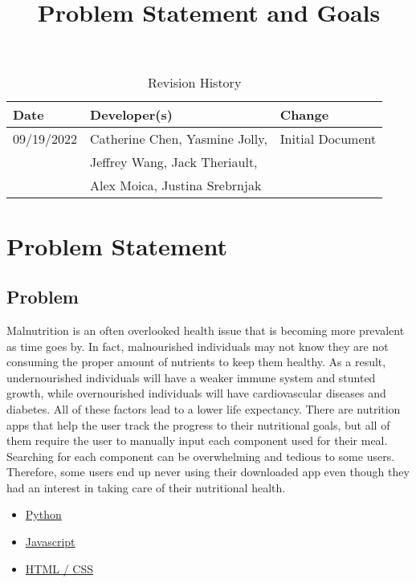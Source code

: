 \documentclass{article}
\title{Problem Statement and Goals\\\progname}
\author{\authname}
\date{}
\begin{document}
\maketitle

\begin{table}[hp]
\caption{Revision History} \label{TblRevisionHistory}
\begin{tabularx}{\textwidth}{llX}
\toprule
\textbf{Date} & \textbf{Developer(s)} & \textbf{Change}\\
\midrule
09/19/2022 & Catherine Chen, Yasmine Jolly, &Initial Document\\ 
&Jeffrey Wang, Jack Theriault, &\\
&Alex Moica, Justina Srebrnjak &\\
\bottomrule
\end{tabularx}
\end{table}

\section{Problem Statement}


\subsection{Problem}

Malnutrition is an often overlooked health issue that is becoming more prevalent as time goes by. In fact, malnourished individuals may not know they are not consuming the proper amount of nutrients to keep them healthy. As a result, undernourished individuals will have a weaker immune system and stunted growth, while overnourished individuals will have cardiovascular diseases and diabetes. All of these factors lead to a lower life expectancy. There are nutrition apps that help the user track the progress to their nutritional goals, but all of them require the user to manually input each component used for their meal. Searching for each component can be overwhelming and tedious to some users. Therefore, some users end up never using their downloaded app even though they had an interest in taking care of their nutritional health.
\begin{itemize}
	\item \href{https://peps.python.org/pep-0008/}{Python}
	\item \href{https://google.github.io/styleguide/jsguide.html}{Javascript}
	\item \href{https://google.github.io/styleguide/htmlcssguide.html}{HTML / CSS}
\end{itemize}
\end{document}

